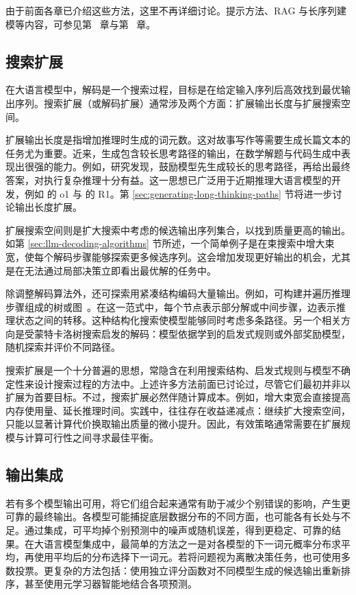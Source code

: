 由于前面各章已介绍这些方法，这里不再详细讨论。提示方法、RAG 与长序列建模等内容，可参见第 \ChapterLLM\ 章与第 \ChapterLLMPrompting\ 章。

\subsection{搜索扩展}

在大语言模型中，解码是一个搜索过程，目标是在给定输入序列后高效找到最优输出序列。搜索扩展（或解码扩展）通常涉及两个方面：扩展输出长度与扩展搜索空间。

扩展输出长度是指增加推理时生成的词元数。这对故事写作等需要生成长篇文本的任务尤为重要。近来，生成包含较长思考路径的输出，在数学解题与代码生成中表现出很强的能力。例如，研究发现，鼓励模型先生成较长的思考路径，再给出最终答案，对执行复杂推理十分有益。这一思想已广泛用于近期推理大语言模型的开发，例如 \citet{openai:2024learning} 的 o1 与 \citet{deepseek:2025r1} 的 R1。第 \ref{sec:generating-long-thinking-paths} 节将进一步讨论输出长度扩展。

扩展搜索空间则是扩大搜索中考虑的候选输出序列集合，以找到质量更高的输出。如第 \ref{sec:llm-decoding-algorithms} 节所述，一个简单例子是在束搜索中增大束宽，使每个解码步骤能够探索更多候选序列。这会增加发现更好输出的机会，尤其是在无法通过局部决策立即看出最优解的任务中。

除调整解码算法外，还可探索用紧凑结构编码大量输出。例如，可构建并遍历推理步骤组成的树或图~\cite{yao-etal:2024tree}。在这一范式中，每个节点表示部分解或中间步骤，边表示推理状态之间的转移。这种结构化搜索使模型能够同时考虑多条路径。另一个相关方向是受蒙特卡洛树搜索启发的解码：模型依据学到的启发式规则或外部奖励模型，随机探索并评价不同路径。

搜索扩展是一个十分普遍的思想，常隐含在利用搜索结构、启发式规则与模型不确定性来设计搜索过程的方法中。上述许多方法前面已讨论过，尽管它们最初并非以扩展为首要目标。不过，搜索扩展必然伴随计算成本。例如，增大束宽会直接提高内存使用量、延长推理时间。实践中，往往存在收益递减点：继续扩大搜索空间，只能以显著计算代价换取输出质量的微小提升。因此，有效策略通常需要在扩展规模与计算可行性之间寻求最佳平衡。

\subsection{输出集成}

若有多个模型输出可用，将它们组合起来通常有助于减少个别错误的影响，产生更可靠的最终输出。各模型可能捕捉底层数据分布的不同方面，也可能各有长处与不足。通过集成，可平均掉个别预测中的噪声或随机误差，得到更稳定、可靠的结果。在大语言模型集成中，最简单的方法之一是对各模型的下一词元概率分布求平均，再使用平均后的分布选择下一词元。若将问题视为离散决策任务，也可使用多数投票。更复杂的方法包括：使用独立评分函数对不同模型生成的候选输出重新排序，甚至使用元学习器智能地结合各项预测。

